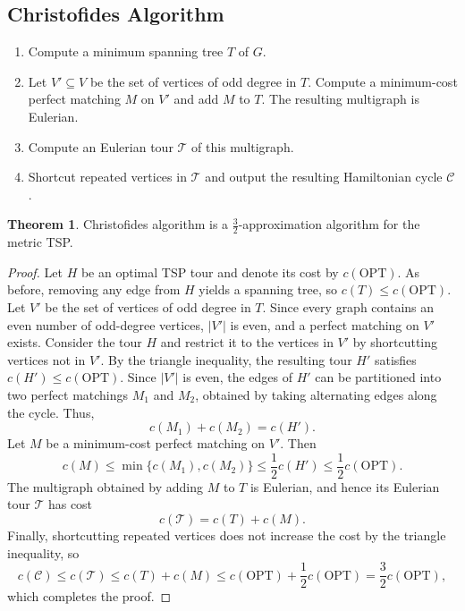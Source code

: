 \documentclass[12pt]{report}
\theoremstyle{definition}
\newtheorem{theorem}{Theorem}
\begin{document}
\subsection{Christofides Algorithm}

\begin{enumerate}
    \item Compute a minimum spanning tree $T$ of $G$.
    \item Let $V' \subseteq V$ be the set of vertices of odd degree in $T$. 
          Compute a minimum-cost perfect matching $M$ on $V'$ and add $M$ to $T$. 
          The resulting multigraph is Eulerian.
    \item Compute an Eulerian tour $\mathcal{T}$ of this multigraph.
    \item Shortcut repeated vertices in $\mathcal{T}$ and output the resulting 
          Hamiltonian cycle $\mathcal{C}$.
\end{enumerate}

\begin{theorem}
Christofides algorithm is a $\tfrac{3}{2}$-approximation algorithm for the metric TSP.
\end{theorem}

\begin{proof}
Let $H$ be an optimal TSP tour and denote its cost by $c(\mathrm{OPT})$. As before, removing any edge from $H$ yields a spanning tree, so \( c(T) \leq c(\mathrm{OPT})\). Let $V'$ be the set of vertices of odd degree in $T$. Since every graph contains an even number of odd-degree vertices, $|V'|$ is even, and a perfect matching on $V'$ exists. Consider the tour $H$ and restrict it to the vertices in $V'$ by shortcutting vertices not in $V'$. By the triangle inequality, the resulting tour $H'$ satisfies \(c(H') \leq c(\mathrm{OPT})\). Since $|V'|$ is even, the edges of $H'$ can be partitioned into two perfect matchings $M_1$ and $M_2$, obtained by taking alternating edges along the cycle. Thus,
\[
c(M_1) + c(M_2) = c(H').
\]
Let $M$ be a minimum-cost perfect matching on $V'$. Then
\[
c(M) \leq \min\{c(M_1), c(M_2)\}
      \leq \frac{1}{2} c(H')
      \leq \frac{1}{2} c(\mathrm{OPT}).
\]
The multigraph obtained by adding $M$ to $T$ is Eulerian, and hence its Eulerian tour $\mathcal{T}$ has cost
\[
c(\mathcal{T}) = c(T) + c(M).
\]
Finally, shortcutting repeated vertices does not increase the cost by the triangle inequality, so
\[
c(\mathcal{C}) \leq c(\mathcal{T})
              \leq c(T) + c(M)
              \leq c(\mathrm{OPT}) + \frac{1}{2}c(\mathrm{OPT})
              = \frac{3}{2}c(\mathrm{OPT}),
\]
which completes the proof.
\end{proof}
\end{document}
